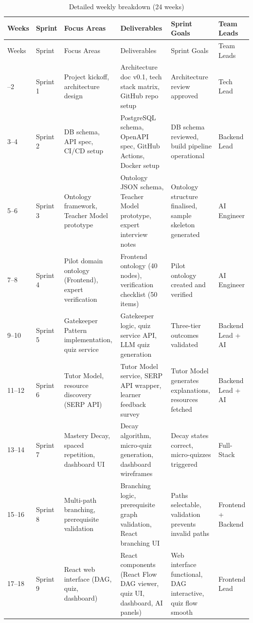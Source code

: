 \begin{longtable}{llllll}
    \caption{Detailed weekly breakdown (24 weeks)}
    \label{tab:ch01_plan}\\
    \toprule
    Weeks & Sprint & Focus Areas & Deliverables & Sprint Goals & Team Leads \\
    \midrule
    \endfirsthead
    \toprule
    Weeks & Sprint & Focus Areas & Deliverables & Sprint Goals & Team Leads \\
    \midrule
    \endhead
    \bottomrule
    \endfoot
    1--2   & Sprint 1  & Project kickoff, architecture design & Architecture doc v0.1, tech stack matrix, GitHub repo setup & Architecture review approved & Tech Lead \\
    3--4   & Sprint 2  & DB schema, API spec, CI/CD setup & PostgreSQL schema, OpenAPI spec, GitHub Actions, Docker setup & DB schema reviewed, build pipeline operational & Backend Lead \\
    5--6   & Sprint 3  & Ontology framework, Teacher Model prototype & Ontology JSON schema, Teacher Model prototype, expert interview notes & Ontology structure finalised, sample skeleton generated & AI Engineer \\
    7--8   & Sprint 4  & Pilot domain ontology (Frontend), expert verification & Frontend ontology (40 nodes), verification checklist (50 items) & Pilot ontology created and verified & AI Engineer \\
    9--10  & Sprint 5  & Gatekeeper Pattern implementation, quiz service & Gatekeeper logic, quiz service API, LLM quiz generation & Three-tier outcomes validated & Backend Lead + AI \\
    11--12 & Sprint 6  & Tutor Model, resource discovery (SERP API) & Tutor Model service, SERP API wrapper, learner feedback survey & Tutor Model generates explanations, resources fetched & Backend Lead + AI \\
    13--14 & Sprint 7  & Mastery Decay, spaced repetition, dashboard UI & Decay algorithm, micro-quiz generation, dashboard wireframes & Decay states correct, micro-quizzes triggered & Full-Stack \\
    15--16 & Sprint 8  & Multi-path branching, prerequisite validation & Branching logic, prerequisite graph validation, React branching UI & Paths selectable, validation prevents invalid paths & Frontend + Backend \\
    17--18 & Sprint 9  & React web interface (DAG, quiz, dashboard) & React components (React Flow DAG viewer, quiz UI, dashboard, AI panels) & Web interface functional, DAG interactive, quiz flow smooth & Frontend Lead \\

\end{longtable}
